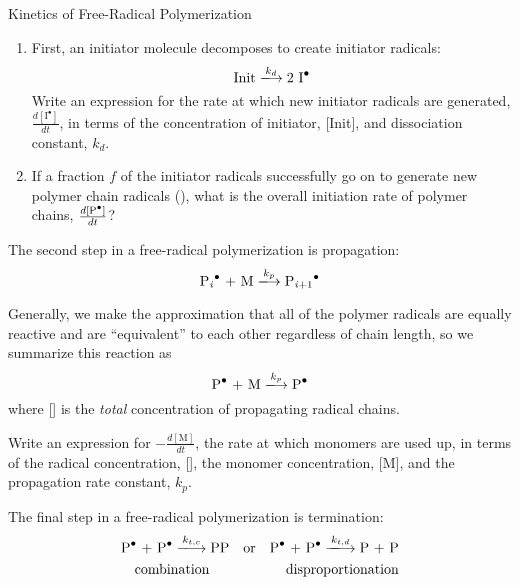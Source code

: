 \begin{activity}{Kinetics of Free-Radical Polymerization}
\begin{ctqs}
\begin{enumerate}
			\item First, an initiator molecule decomposes to create initiator radicals:
				\begin{equation*}
					\text{Init} \xlongrightarrow{k_d} \text{2 \ce{I^.}}
				\end{equation*}	
				Write an expression for the rate at which new initiator radicals are generated, $\frac{d[\text{I}^{\bullet}]}{dt}$, in terms of the concentration of initiator, [Init], and dissociation constant, $k_d$.
		
				\begin{solution}[1.25in]
				\end{solution}
		
			\item If a fraction $f$ of the initiator radicals successfully go on to generate new polymer chain radicals (), what is the overall initiation rate of polymer chains, $\frac{d[\text{\ce{P^.}}]}{dt}$?
		
				\begin{solution}[1.25in]
				\end{solution}
		
		\end{enumerate}
		
	\question The second step in a free-radical polymerization is propagation:
		\begin{equation*}
			\text{\ce{P_i^.} + M} \xlongrightarrow{k_p} \text{\ce{P_{i+1}^.}}
		\end{equation*}
		
		Generally, we make the approximation that all of the polymer radicals are equally reactive and are ``equivalent'' to each other regardless of chain length, so we summarize this reaction as
		\begin{equation*}
			\text{\ce{P^.} + M} \xlongrightarrow{k_p} \text{\ce{P^.}}
		\end{equation*}
		where [] is the \emph{total} concentration of propagating radical chains.
	
		Write an expression for $-\frac{d[\text{M}]}{dt}$, the rate at which monomers are used up, in terms of the radical concentration, [], the monomer concentration, [M], and the propagation rate constant, $k_p$.
		
		\begin{solution}[1.25in]
		\end{solution}
		
	\question The final step in a free-radical polymerization is termination:
		\begin{align*}
			\text{\ce{P^.} + \ce{P^.}} \xlongrightarrow{k_{t,c}} \text{\ce{PP}} && \text{or} && \text{\ce{P^.} + \ce{P^.}} \xlongrightarrow{k_{t,d}} \text{P + P}\\
			\text{combination\hspace{0.5cm}} && && \text{disproportionation}
		\end{align*}
		

\end{ctqs}
\end{activity}
